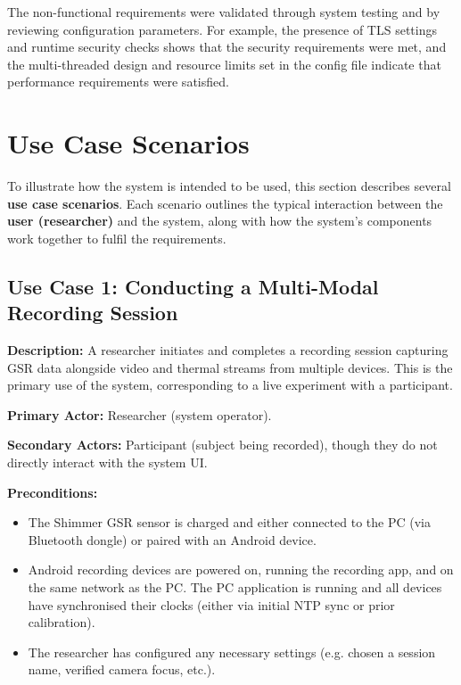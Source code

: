 The non-functional requirements were validated through system testing and by reviewing configuration parameters. For example, the presence of TLS settings and runtime security checks shows that the security requirements were met, and the multi-threaded design and resource limits set in the config file indicate that performance requirements were satisfied.

\section{Use Case Scenarios}
To illustrate how the system is intended to be used, this section describes several \textbf{use case scenarios}. Each scenario outlines the typical interaction between the \textbf{user (researcher)} and the system, along with how the system's components work together to fulfil the requirements.

\subsection{Use Case 1: Conducting a Multi-Modal Recording Session}
\textbf{Description:} A researcher initiates and completes a recording session capturing GSR data alongside video and thermal streams from multiple devices. This is the primary use of the system, corresponding to a live experiment with a participant.

\textbf{Primary Actor:} Researcher (system operator).

\textbf{Secondary Actors:} Participant (subject being recorded), though they do not directly interact with the system UI.

\textbf{Preconditions:}
\begin{itemize}
  \item The Shimmer GSR sensor is charged and either connected to the PC (via Bluetooth dongle) or paired with an Android device.
  \item Android recording devices are powered on, running the recording app, and on the same network as the PC. The PC application is running and all devices have synchronised their clocks (either via initial NTP sync or prior calibration).
  \item The researcher has configured any necessary settings (e.g. chosen a session name, verified camera focus, etc.).
\end{itemize}

